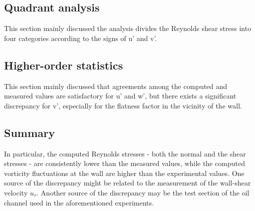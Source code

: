 \subsection{Quadrant analysis}
This section mainly discussed the analysis divides the Reynolds shear stress into four categories according to the signs of u’ and v’. 
\subsection{Higher-order statistics}
This section mainly discussed that agreements among the computed and measured  values are satisfactory for u' and w', but there exists a significant discrepancy for v', especially for the flatness factor in the vicinity of the wall.
\subsection{Summary}
In particular, the computed Reynolds stresses - both the normal and the shear stresses - are consistently lower than the measured values, while the computed vorticity  fluctuations at the wall are higher than  the experimental values. 
One source of the discrepancy might be related to the measurement of the wall-shear velocity $u_\tau$.
Another source of the discrepancy may be the test section of the oil channel used in the aforementioned experiments. 
